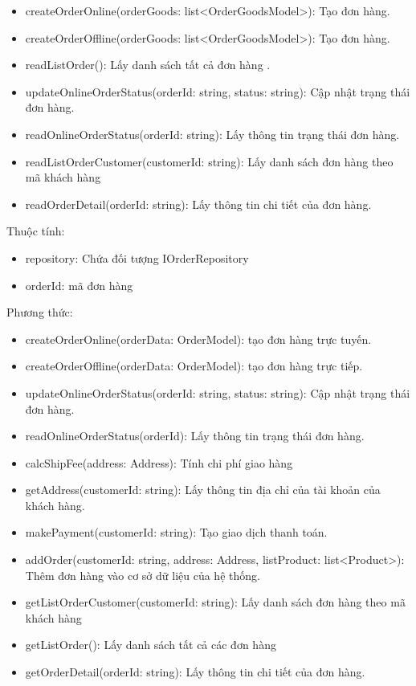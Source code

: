 \begin{itemize}
	\item createOrderOnline(orderGoods: list<OrderGoodsModel>): Tạo đơn hàng.
	\item createOrderOffline(orderGoods: list<OrderGoodsModel>): Tạo đơn hàng.
	\item readListOrder(): Lấy danh sách tất cả đơn hàng .
	\item updateOnlineOrderStatus(orderId: string, status: string): Cập nhật trạng thái đơn hàng.
	\item readOnlineOrderStatus(orderId: string): Lấy thông tin trạng thái đơn hàng.
	\item readListOrderCustomer(customerId: string): Lấy danh sách đơn hàng theo mã khách hàng
	\item readOrderDetail(orderId: string): Lấy thông tin chi tiết của đơn hàng.
\end{itemize}

Thuộc tính:
\begin{itemize}
	\item repository: Chứa đối tượng IOrderRepository
	\item orderId: mã đơn hàng
\end{itemize}
Phương thức:
\begin{itemize}
	\item createOrderOnline(orderData: OrderModel): tạo đơn hàng trực tuyến.
	\item createOrderOffline(orderData: OrderModel): tạo đơn hàng trực tiếp.
	\item updateOnlineOrderStatus(orderId: string, status: string): Cập nhật trạng thái đơn hàng.
	\item readOnlineOrderStatus(orderId): Lấy thông tin trạng thái đơn hàng.
	\item calcShipFee(address: Address): Tính chi phí giao hàng
	\item getAddress(customerId: string): Lấy thông tin địa chỉ của tài khoản của khách hàng.
	\item makePayment(customerId: string): Tạo giao dịch thanh toán.
	\item addOrder(customerId: string, address: Address, listProduct: list<Product>): Thêm đơn hàng vào cơ sở dữ liệu của hệ thống.
	\item getListOrderCustomer(customerId: string): Lấy danh sách đơn hàng theo mã khách hàng
	\item getListOrder(): Lấy danh sách tất cả các đơn hàng
	\item getOrderDetail(orderId: string): Lấy thông tin chi tiết của đơn hàng.
\end{itemize}


